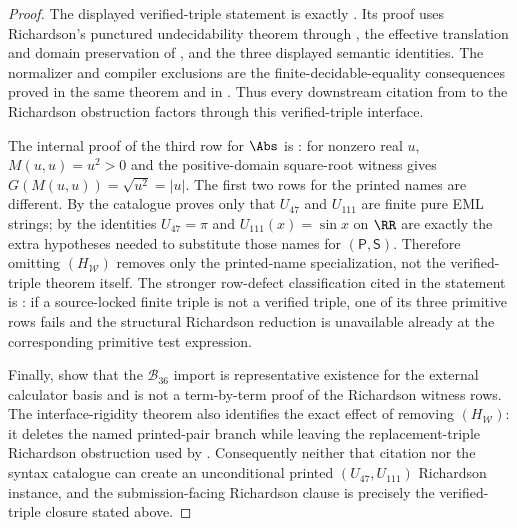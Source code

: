 \begin{proof}
The displayed verified-triple statement is exactly .  Its
proof uses Richardson's punctured undecidability theorem through
, the effective translation and
domain preservation of
, and
the three displayed semantic identities.  The normalizer and compiler exclusions
are the finite-decidable-equality consequences proved in the same theorem and in
.  Thus every downstream citation from
to the Richardson obstruction factors through this verified-triple interface.

The internal proof of the third row for \(\Abs\) is
: for nonzero real \(u\),
\(M(u,u)=u^2>0\) and the positive-domain square-root witness gives
\(G(M(u,u))=\sqrt{u^2}=|u|\).  The first two rows for the printed names are
different.  By  the catalogue proves only that
\(U_{47}\) and \(U_{111}\) are finite pure EML strings; by
the identities \(U_{47}=\pi\) and \(U_{111}(x)=\sin x\) on \(\RR\) are exactly the
extra hypotheses needed to substitute those names for \((\mathsf P,\mathsf S)\).
Therefore omitting \((H_{\mathcal W})\) removes only the printed-name
specialization, not the verified-triple theorem itself.  The stronger row-defect
classification cited in the statement is :
if a source-locked finite triple is not a verified triple, one of its three
primitive rows fails and the structural Richardson reduction is unavailable
already at the corresponding primitive test expression.

Finally,
show that the \(\mathcal B_{36}\) import is representative existence for the
external calculator basis and is not a term-by-term proof of the Richardson
witness rows.  The interface-rigidity theorem also identifies the exact effect
of removing \((H_{\mathcal W})\): it deletes the named printed-pair branch while
leaving the replacement-triple Richardson obstruction used by
.  Consequently neither that citation nor the syntax
catalogue can create an unconditional printed \((U_{47},U_{111})\) Richardson
instance, and the submission-facing Richardson clause is precisely the
verified-triple closure stated above.
\end{proof}

